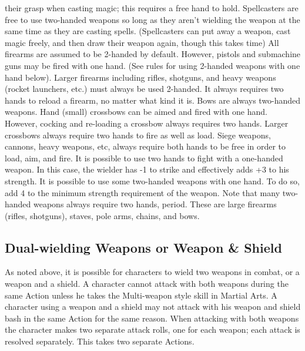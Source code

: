 \documentclass[twoside]{book}
\begin{document}
               their grasp when casting magic; this requires a free hand
               to hold. Spellcasters are free to use two-handed weapons
               so long as they aren't wielding the weapon at the
               same time as they are casting spells. (Spellcasters can
               put away a weapon, cast magic freely, and then draw their
               weapon again, though this takes time)  All firearms are assumed to be 2-handed by default.
               However, pistols and submachine guns may be fired with one
               hand. (See rules for using 2-handed weapons with one hand
               below). Larger firearms including rifles, shotguns, and
               heavy weapons (rocket launchers, etc.) must always be used
               2-handed. It always requires two hands to reload a
               firearm, no matter what kind it is.  Bows are always two-handed weapons. Hand (small)
               crossbows can be aimed and fired with one hand. However,
               cocking and re-loading a crossbow always requires two
               hands. Larger crossbows always require two hands to fire
               as well as load. Siege weapons, cannons, heavy weapons,
               etc, always require both hands to be free in order to
               load, aim, and fire.  It is possible to use two hands to fight with a
               one-handed weapon. In this case, the wielder has -1 to
               strike and effectively adds +3 to his strength.  It is possible to use some two-handed weapons with
               one hand. To do so, add 4 to the minimum strength
               requirement of the weapon. Note that many two-handed
               weapons always require two hands, period. These are large
               firearms (rifles, shotguns), staves, pole arms, chains,
               and bows. 
\subsection{Dual-wielding Weapons or Weapon \& Shield}
     As noted above, it is possible for characters to
               wield two weapons in combat, or a weapon and a shield. A
               character cannot attack with both weapons during the same
               Action unless he takes the Multi-weapon style skill in
               Martial Arts. A character using a weapon and a shield may
               not attack with his weapon and shield bash in the same
               Action for the same reason. When attacking with both
               weapons the character makes two separate attack rolls, one
               for each weapon; each attack is resolved separately. This
               takes two separate Actions.   
                
\end{document}
